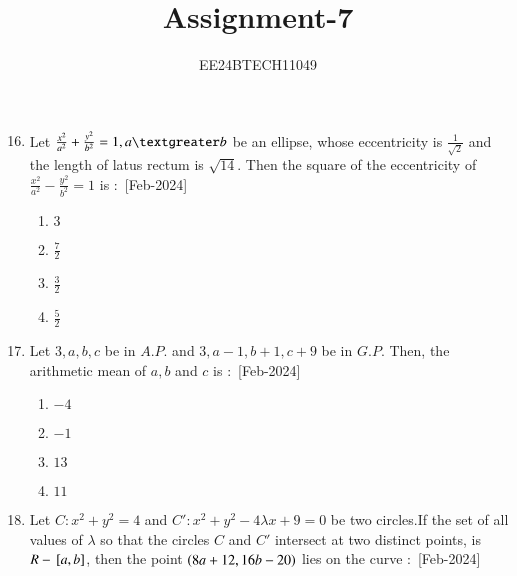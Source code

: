 \documentclass[journal]{IEEEtran}
\begin{document}

\vspace{3cm}

\title{Assignment-7}
\author{EE24BTECH11049}

{\let\newpage\relax\maketitle}

\renewcommand{\thefigure}{\theenumi}
\renewcommand{\thetable}{\theenumi}
\setlength{\intextsep}{10pt} %

\begin{enumerate}
\setcounter{enumi}{15}
    \item Let $\frac{x^2}{a^2}+\frac{y^2}{b^2}=1,a\textgreater b$ be an ellipse, whose eccentricity is $\frac{1}{\sqrt{2}}$ and the length of latus rectum is $\sqrt{14}$. Then the square of the eccentricity of $\frac{x^2}{a^2}-\frac{y^2}{b^2}=1$ is $\colon$
    \hfill{[Feb-2024]}
        \begin{enumerate}
            \item $3$
            \item $\frac{7}{2}$
            \item $\frac{3}{2}$
            \item $\frac{5}{2}$
        \end{enumerate}
    \item Let $3,a,b,c$ be in $A.P.$ and $3,a-1,b+1,c+9$ be in $G.P.$ Then, the arithmetic mean of $a,b$ and $c$ is $\colon$
    \hfill{[Feb-2024]}
        \begin{enumerate}
            \item $-4$
            \item $-1$
            \item $13$
            \item $11$
        \end{enumerate}
    \item Let $C\colon x^2+y^2=4$ and $C\prime\colon x^2+y^2-4\lambda x+9=0$ be two circles.If the set of all values of $\lambda$ so that the circles $C$ and $C\prime$ intersect at two distinct points, is $R-{}\left[a,b\right]$, then the point $\left(8a+12,16b-20\right)$ lies on the curve $\colon$
    \hfill{[Feb-2024]}
        \begin{enumerate}

\end{enumerate}
\end{enumerate}
\end{document}
